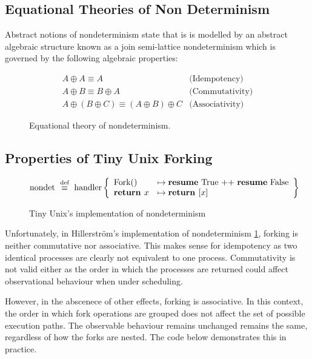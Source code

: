 \documentclass[logo,bsc,singlespacing,parskip]{infthesis}
\begin{document}
\subsection{Equational Theories of Non Determinism}
Abstract notions of nondeterminism state that is is modelled by an abstract algebraic structure known as a join semi-lattice \cite{kiselyov2021extensible} nondeterminism which is governed by the following algebraic properties:

\begin{figure}[H]
\centering
\[
\begin{array}{ll}
  A \oplus A \equiv A & \text{(Idempotency)} \\
  A \oplus B \equiv B \oplus A & \text{(Commutativity)} \\
  A \oplus (B \oplus C) \equiv (A \oplus B) \oplus C & \text{(Associativity)}
\end{array}
\]
\caption{%
  Equational theory of nondeterminism.
}
\end{figure}









\subsection{Properties of Tiny Unix Forking}


\begin{figure}[H]
\centering
\[
\text{nondet} \ \overset{\text{def}}{\equiv} \ \text{handler} \left\{
\begin{array}{ll}
\text{Fork}() &\mapsto \text{\textbf{resume} True ++ \textbf{resume} False} \\
\textbf{return } x &\mapsto \textbf{return } [x]
\end{array}
\right\}
\]
\caption{Tiny Unix's implementation of nondeterminism}
\label{nondetImplementation}
\end{figure}


Unfortunately, in Hillerström's implementation of nondeterminism \ref{nondetImplementation}, forking is neither commutative nor associative. This makes sense for idempotency as two identical processes are clearly not equivalent to one process. Commutativity is not valid either as the order in which the processes are returned could affect observational behaviour when under scheduling.


However, in the abscenece of other effects, forking is associative. In this context, the order in which fork operations are grouped does not affect the set of possible execution paths. The observable behaviour remains unchanged remains the same, regardless of how the forks are nested. The code below demonstrates this in practice.
\end{document}
